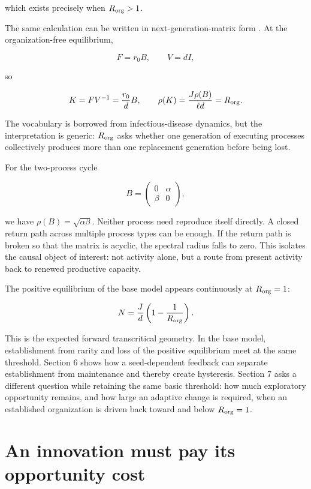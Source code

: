 \documentclass[11pt,a4paper]{article}
\begin{document}
which exists precisely when \(R_{\rm org} > 1\).

The same calculation can be written in next-generation-matrix form
\citep{VandenDriessche2002}. At the organization-free equilibrium,

\[
F = r_0 B, \qquad V = dI,
\]

so

\[
K = FV^{-1} = \frac{r_0}{d}B, \qquad \rho(K) = \frac{J\rho(B)}{\ell d} = R_{\rm org}.
\]

The vocabulary is borrowed from infectious-disease dynamics, but the
interpretation is generic: \(R_{\rm org}\) asks whether one generation
of executing processes collectively produces more than one replacement
generation before being lost.

For the two-process cycle

\[
B = \begin{pmatrix} 0 & \alpha \\ \beta & 0 \end{pmatrix},
\]

we have \(\rho(B) = \sqrt{\alpha\beta}\). Neither process need reproduce
itself directly. A closed return path across multiple process types can
be enough. If the return path is broken so that the matrix is acyclic,
the spectral radius falls to zero. This isolates the causal object of
interest: not activity alone, but a route from present activity back to
renewed productive capacity.

The positive equilibrium of the base model appears continuously at
\(R_{\rm org} = 1\):

\[
N = \frac{J}{d}\left(1 - \frac{1}{R_{\rm org}}\right).
\]

This is the expected forward transcritical geometry. In the base model,
establishment from rarity and loss of the positive equilibrium meet at
the same threshold. Section 6 shows how a seed-dependent feedback can
separate establishment from maintenance and thereby create hysteresis.
Section 7 asks a different question while retaining the same basic
threshold: how much exploratory opportunity remains, and how large an
adaptive change is required, when an established organization is driven
back toward and below \(R_{\rm org}=1\).

\section{An innovation must pay its opportunity
cost}\label{an-innovation-must-pay-its-opportunity-cost}
\end{document}
